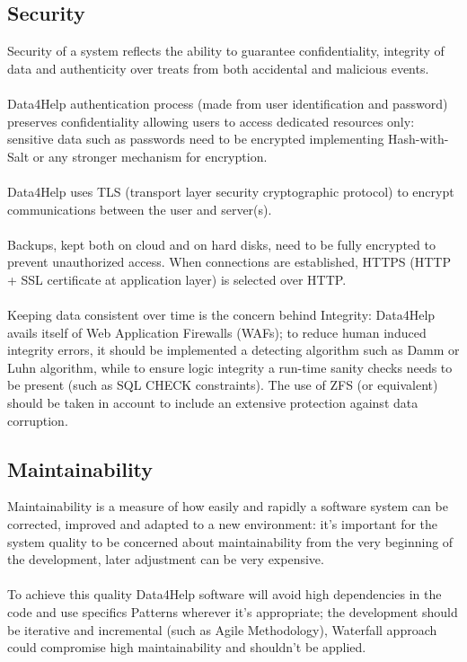 \subsection{Security}
Security of a system reflects the ability to guarantee confidentiality, integrity of data and authenticity over treats from both accidental and malicious events.
\\
\\ 
Data4Help authentication process (made from user identification and password) preserves confidentiality allowing users to access dedicated resources only: sensitive data such as passwords need to be encrypted implementing Hash-with-Salt or any stronger mechanism for encryption. 
\\
\\
Data4Help uses TLS (transport layer security cryptographic protocol) to encrypt communications between the user and server(s).
\\
\\
Backups, kept both on cloud and on hard disks, need to be fully encrypted to prevent unauthorized access. When connections are established, HTTPS (HTTP + SSL certificate at application layer) is selected over HTTP.
\\
\\
Keeping data consistent over time is the concern behind Integrity: Data4Help avails itself of Web Application Firewalls (WAFs); to reduce human induced integrity errors, it should be implemented a detecting algorithm such as Damm or Luhn algorithm, while to ensure logic integrity a run-time sanity checks needs to be present (such as SQL CHECK constraints). The use of ZFS (or equivalent) should be taken in account to include an extensive protection against data corruption. 
\subsection{Maintainability}
Maintainability is a measure of how easily and rapidly a software system can be corrected, improved and adapted to a new environment: it’s important for the system quality to be concerned about maintainability from the very beginning of the development, later adjustment can be very expensive.
\\
\\
To achieve this quality Data4Help software will avoid high dependencies in the code and use specifics Patterns wherever it’s appropriate; the development should be iterative and incremental (such as Agile Methodology), Waterfall approach could compromise high maintainability and shouldn’t be applied. 
